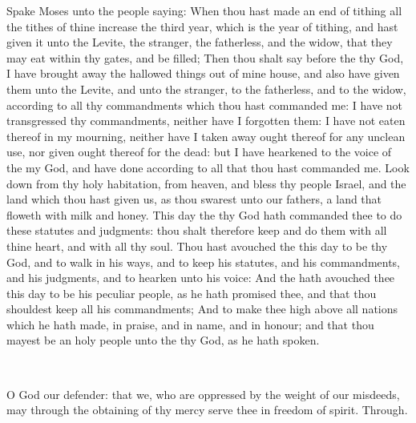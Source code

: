  Spake Moses unto the people saying: When thou hast made an end of tithing all the tithes of thine increase the third year, which is the year of tithing, and hast given it unto the Levite, the stranger, the fatherless, and the widow, that they may eat within thy gates, and be filled; Then thou shalt say before the  thy God, I have brought away the hallowed things out of mine house, and also have given them unto the Levite, and unto the stranger, to the fatherless, and to the widow, according to all thy commandments which thou hast commanded me: I have not transgressed thy commandments, neither have I forgotten them: I have not eaten thereof in my mourning, neither have I taken away ought thereof for any unclean use, nor given ought thereof for the dead: but I have hearkened to the voice of the  my God, and have done according to all that thou hast commanded me. Look down from thy holy habitation, from heaven, and bless thy people Israel, and the land which thou hast given us, as thou swarest unto our fathers, a land that floweth with milk and honey. This day the  thy God hath commanded thee to do these statutes and judgments: thou shalt therefore keep and do them with all thine heart, and with all thy soul. Thou hast avouched the  this day to be thy God, and to walk in his ways, and to keep his statutes, and his commandments, and his judgments, and to hearken unto his voice: And the  hath avouched thee this day to be his peculiar people, as he hath promised thee, and that thou shouldest keep all his commandments; And to make thee high above all nations which he hath made, in praise, and in name, and in honour; and that thou mayest be an holy people unto the  thy God, as he hath spoken.

\\


\collect
{} O God our defender: that we, who are oppressed by the weight of our misdeeds, may through the obtaining of thy mercy serve thee in freedom of spirit. Through.

